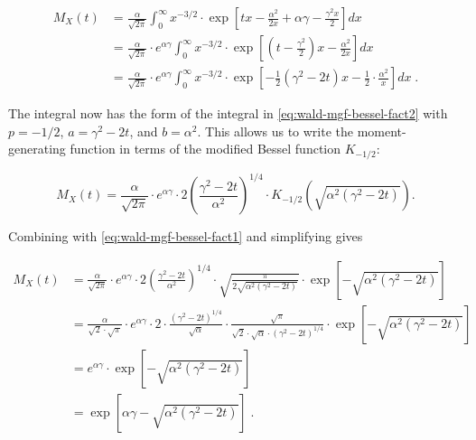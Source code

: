 \documentclass[a4paper,12pt,twoside]{book}
\begin{document}
\begin{equation} \label{eq:wald-mgf-wald-mgf-s2}
\begin{split}
M_X(t) &= \frac{\alpha}{\sqrt{2\pi}} \int_0^{\infty} x^{-3/2}\cdot \exp\left[ tx - \frac{\alpha^2}{2x} + \alpha\gamma - \frac{\gamma^2x}{2}\right]dx \\
       &= \frac{\alpha}{\sqrt{2\pi}}\cdot e^{\alpha \gamma} \int_0^{\infty} x^{-3/2}\cdot \exp\left[\left(t-\frac{\gamma^2}{2}\right)x - \frac{\alpha^2}{2x}\right]dx \\
       &= \frac{\alpha}{\sqrt{2\pi}}\cdot e^{\alpha \gamma} \int_0^{\infty} x^{-3/2}\cdot \exp \left[-\frac{1}{2}\left(\gamma^2-2t\right)x - \frac{1}{2}\cdot \frac{\alpha^2}{x}\right]dx \; .
\end{split}
\end{equation}

The integral now has the form of the integral in \eqref{eq:wald-mgf-bessel-fact2} with $p=-1/2$, $a=\gamma^2-2t$, and $b=\alpha^2$. This allows us to write the moment-generating function in terms of the modified Bessel function $K_{-1/2}$:

\begin{equation} \label{eq:wald-mgf-wald-mgf-s3}
M_X(t) = \frac{\alpha}{\sqrt{2\pi}}\cdot e^{\alpha \gamma}\cdot 2\left(\frac{\gamma^2-2t}{\alpha^2}\right)^{1/4}\cdot K_{-1/2}\left(\sqrt{\alpha^2(\gamma^2-2t)}\right).
\end{equation}

Combining with \eqref{eq:wald-mgf-bessel-fact1} and simplifying gives

\begin{equation} \label{eq:wald-mgf-wald-mgf-s4}
\begin{split}
M_X(t) &= \frac{\alpha}{\sqrt{2\pi}}\cdot e^{\alpha \gamma}\cdot 2\left(\frac{\gamma^2-2t}{\alpha^2}\right)^{1/4} \cdot \sqrt{\frac{\pi}{2\sqrt{\alpha^2(\gamma^2-2t)}}}\cdot \exp\left[-\sqrt{\alpha^2(\gamma^2-2t)}\right] \\
       &= \frac{\alpha}{\sqrt{2}\cdot \sqrt{\pi}}\cdot e^{\alpha \gamma}\cdot 2 \cdot \frac{(\gamma^2-2t)^{1/4}}{\sqrt{\alpha}}\cdot \frac{\sqrt{\pi}}{\sqrt{2}\cdot \sqrt{\alpha}\cdot (\gamma^2-2t)^{1/4}}\cdot \exp\left[-\sqrt{\alpha^2(\gamma^2-2t)}\right] \\
       &= e^{\alpha \gamma} \cdot \exp\left[-\sqrt{\alpha^2(\gamma^2-2t)}\right] \\
       &= \exp\left[\alpha \gamma-\sqrt{\alpha^2(\gamma^2-2t)}\right] \; .
\end{split}
\end{equation}
\end{document}

